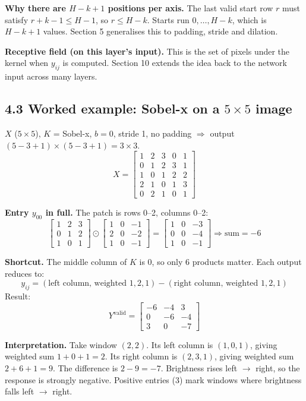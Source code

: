 \textbf{Why there are $H-k+1$ positions per axis.} The last valid start row $r$ must satisfy $r+k-1 \le H-1$, so $r \le H-k$. Starts run $0,\dots,H-k$, which is $H-k+1$ values. Section 5 generalises this to padding, stride and dilation.

\textbf{Receptive field (on this layer's input).} This is the set of pixels under the kernel when $y_{ij}$ is computed. Section 10 extends the idea back to the network input across many layers.

\subsection*{4.3 Worked example: Sobel-x on a $5\times5$ image}

$X$ ($5\times5$), $K$ = Sobel-x, $b=0$, stride 1, no padding $\Rightarrow$ output $(5-3+1)\times(5-3+1) = 3\times3$.
\[
X = \begin{bmatrix}1&2&3&0&1\\0&1&2&3&1\\1&0&1&2&2\\2&1&0&1&3\\0&2&1&0&1\end{bmatrix}
\]

\textbf{Entry $y_{00}$ in full.} The patch is rows 0--2, columns 0--2:
\[
\begin{bmatrix}1&2&3\\0&1&2\\1&0&1\end{bmatrix} \odot \begin{bmatrix}1&0&-1\\2&0&-2\\1&0&-1\end{bmatrix} = \begin{bmatrix}1&0&-3\\0&0&-4\\1&0&-1\end{bmatrix} \Rightarrow \text{sum} = -6
\]

\textbf{Shortcut.} The middle column of $K$ is 0, so only 6 products matter. Each output reduces to:
\[
y_{ij} = (\text{left column, weighted } 1,2,1) - (\text{right column, weighted } 1,2,1)
\]
Result:
\[
Y^{\text{valid}} = \begin{bmatrix}-6&-4&3\\0&-6&-4\\3&0&-7\end{bmatrix}
\]

\textbf{Interpretation.} Take window $(2,2)$. Its left column is $(1,0,1)$, giving weighted sum $1+0+1=2$. Its right column is $(2,3,1)$, giving weighted sum $2+6+1=9$. The difference is $2-9=-7$. Brightness rises left $\to$ right, so the response is strongly negative. Positive entries (3) mark windows where brightness falls left $\to$ right.

